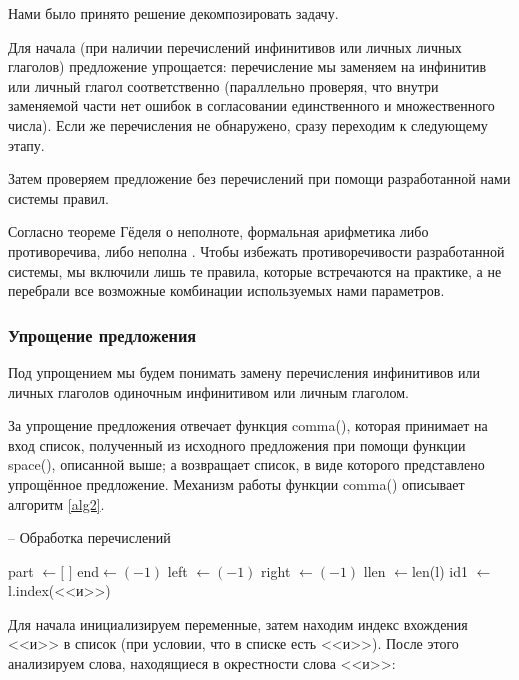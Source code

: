 \documentclass[main]{subfiles}
\begin{document}
Нами было принято решение декомпозировать задачу. 

Для начала (при наличии перечислений инфинитивов или личных личных глаголов) предложение упрощается: перечисление мы заменяем на инфинитив или личный глагол соответственно (параллельно проверяя, что внутри заменяемой части нет ошибок в согласовании единственного и множественного числа). Если же перечисления не обнаружено, сразу переходим к следующему этапу.

Затем проверяем предложение без перечислений при помощи разработанной нами системы правил. 

Согласно теореме Гёделя о неполноте, формальная арифметика либо противоречива, либо неполна \cite{forms}. Чтобы избежать противоречивости разработанной системы, мы включили лишь те правила, которые встречаются на практике, а не перебрали все возможные комбинации используемых нами параметров.

\subsubsection{Упрощение предложения}
Под упрощением мы будем понимать замену перечисления инфинитивов или личных глаголов одиночным инфинитивом или личным глаголом. 

За упрощение предложения отвечает функция comma(), которая принимает на вход список, полученный из исходного предложения при помощи функции space(), описанной выше; а возвращает список, в виде которого представлено упрощённое предложение. Механизм работы функции comma() описывает алгоритм \ref{alg2}.

\begin{algorithm}
	\caption{-- Обработка перечислений}\label{alg2}
	\begin{algorithmic}[1]
		 
		\State part $\gets [$ $]$ 
		\State end$\gets (-1)$ 
		\State left $\gets (-1)$ 
		\State right $\gets (-1)$
		\State llen $\gets $len(l) 
		\State id1 $\gets$ l.index(<<и>>) 
	\end{algorithmic}
\end{algorithm}
Для начала инициализируем переменные, затем находим индекс вхождения <<и>> в список (при условии, что в списке есть <<и>>). После этого анализируем слова, находящиеся в окрестности слова <<и>>:
\end{document}
